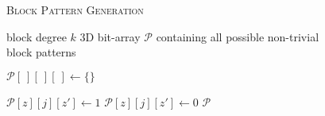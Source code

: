 
\begin{figure}[h]
	\noindent \hspace*{6pt}{\bf Algorithm 2.1}
	\textsc{Block Pattern Generation}\small
	\begin{algorithmic}[1]\label{alg:block-pattern-gen}
		\Require block degree $k$
		\Ensure 3D bit-array $\mathcal{P}$ containing all possible non-trivial block patterns \vspace*{6pt}

		\State $\mathcal{P}[\ ][\ ][\ ] \leftarrow \{\}$ \hspace*{90pt}

			\State $\mathcal{P}[z][j][z'] \leftarrow 1$
		\Else
			\State $\mathcal{P}[z][j][z'] \leftarrow 0$
		\EndIf\EndFor\EndFor\EndFor
		\State\Return $\mathcal{P}$
		\end{algorithmic}
\end{figure}

